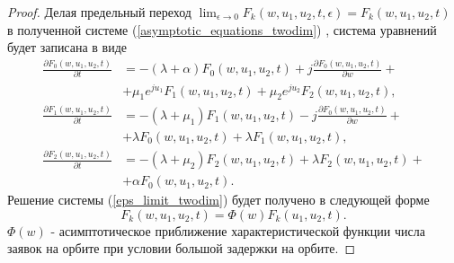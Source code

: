 \begin{proof}
	Делая предельный переход $ \lim_{\epsilon \xrightarrow{} 0} F_{k}(w,u_{1},u_{2},t,\epsilon) = F_{k}(w,u_{1},u_{2},t)$  в полученной системе (\ref{asymptotic_equations_twodim}) , система уравнений будет записана в виде
	\begin{equation} \label{eps_limit_twodim}
		\begin{split}
			\frac{{\partial F_{0}(w,u_{1},u_{2},t)}}{{\partial t}} &= -(\lambda + \alpha)F_{0}(w,u_{1},u_{2},t) + j
			\frac{{\partial F_{0}(w,u_{1},u_{2},t)}}{{\partial w}} +\\  &+ \mu_{1} e^{ju_{1}}F_{1}(w,u_{1},u_{2},t) + \mu_{2}e^{ju_{2}}F_{2}(w,u_{1},u_{2},t) ,
			\\
			\frac{{\partial F_{1}(w,u_{1},u_{2},t)}}{{\partial t}} &= -(\lambda + \mu_{1})F_{1}(w,u_{1},u_{2},t) - j 
			\frac{{\partial F_{0}(w,u_{1},u_{2},t)}}{{\partial w}} +\\  &+ \lambda F_{0}(w,u_{1},u_{2},t) + \lambda F_{1}(w,u_{1},u_{2},t) ,
			\\
			\frac{{\partial F_{2}(w,u_{1},u_{2},t)}}{{\partial t}} &= -(\lambda + \mu_{2})F_{2}(w,u_{1},u_{2},t)  + \lambda F_{2}(w,u_{1},u_{2},t) +\\  &+ \alpha F_{0}(w,u_{1},u_{2},t).
		\end{split}
	\end{equation}  
	Решение системы (\ref{eps_limit_twodim}) будет получено в следующей форме
	\begin{equation} \label{solution_twodim}
		F_{k}(w,u_{1},u_{2},t) = \Phi(w)F_{k}(u_{1},u_{2},t).
	\end{equation}  
	$\Phi(w)$ - асимптотическое приближение характеристической функции числа заявок на орбите при условии большой задержки на орбите.
	

\end{proof}
